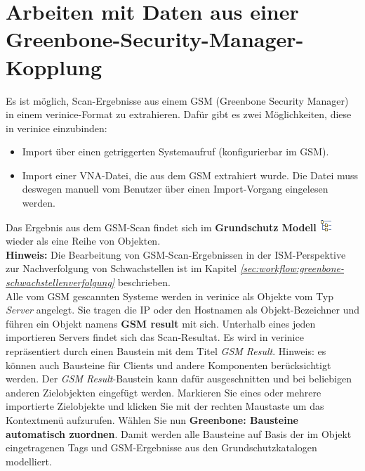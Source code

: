 \documentclass[a4paper,10pt]{book}
\begin{document}
\section{Arbeiten mit Daten aus einer Greenbone-Security-Manager-Kopplung} \label{Arbeiten mit Daten aus einer Greenbone-Security-Manager-Kopplung}
Es ist möglich, Scan-Ergebnisse aus einem GSM (Greenbone Security Manager) in einem verinice-Format zu extrahieren.
Dafür gibt es zwei Möglichkeiten, diese in verinice einzubinden:
 \begin{itemize}
   \item Import über einen getriggerten Systemaufruf (konfigurierbar im GSM).
   \item Import einer VNA-Datei, die aus dem GSM extrahiert wurde. Die Datei muss deswegen manuell vom Benutzer
   über einen Import-Vorgang eingelesen werden.
 \end{itemize}
 Das Ergebnis aus dem GSM-Scan findet sich im \textbf{Grundschutz Modell \includegraphics[height=2ex]{Icon/GS_Modell.png}} wieder als eine Reihe von Objekten.
 \newline\\
 \textbf{Hinweis:} Die Bearbeitung von GSM-Scan-Ergebnissen in der ISM-Perspektive zur Nachverfolgung von Schwachstellen
 ist im Kapitel {\em \ref{sec:workflow:greenbone-schwachstellenverfolgung} \newline {}} beschrieben.
 \newline\\
Alle vom GSM gescannten Systeme werden in verinice als Objekte vom Typ
{\em Server} angelegt. Sie tragen die IP oder den Hostnamen als Objekt-Bezeichner und führen ein Objekt namens \textbf{GSM result} mit sich.
Unterhalb eines jeden importieren Servers findet sich das Scan-Resultat.
Es wird in verinice repräsentiert durch einen Baustein mit dem Titel
{\em GSM Result}.
Hinweis: es können auch Bausteine für Clients und andere Komponenten
berücksichtigt werden. Der {\em GSM Result}-Baustein kann dafür ausgeschnitten und
bei beliebigen anderen Zielobjekten eingefügt werden.
 Markieren Sie eines oder mehrere importierte Zielobjekte und klicken Sie mit der rechten Maustaste um das Kontextmenü aufzurufen. Wählen Sie nun
 \textbf{Greenbone: Bausteine automatisch zuordnen}. Damit werden alle Bausteine auf Basis
 der im Objekt eingetragenen Tags und GSM-Ergebnisse aus den Grundschutzkatalogen modelliert.
\end{document}
